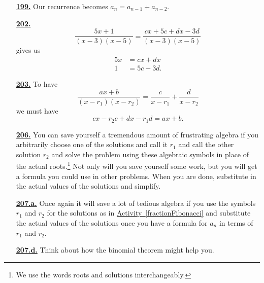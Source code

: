 \documentclass[10pt,]{book}
\theoremstyle{plain}
\theoremstyle{definition}
\theoremstyle{definition}
\theoremstyle{definition}
\numberwithin{equation}{chapter}
\newcommand{\amp}{&}
\begin{document}
\begin{itemize}[itemsep=1em]
\hypertarget{a-199}{}\item[\textbf{\hyperref[originalFibonacci]{199.}}]
\hypertarget{p-933}{}%
Our recurrence becomes \(a_n = a_{n-1} + a_{n-2}\).%

\hypertarget{a-202}{}\item[\textbf{\hyperref[partialfractionsintro]{202.}}]
\hypertarget{p-942}{}%
%
\begin{equation*}
\frac{5x+1}{(x-3)(x-5)} = \frac{cx+5c+dx-3d}{(x-3)(x-5)}
\end{equation*}
gives us%
\begin{align*}
5x \amp = cx+dx\\
1 \amp= 5c-3d\text{.}
\end{align*}
%

\hypertarget{a-203}{}\item[\textbf{\hyperref[partialfractions1]{203.}}]
\hypertarget{p-945}{}%
To have%
\begin{equation*}
\frac{ax+b}{(x-r_1)(x-r_2)} = \frac{c}{x-r_1} + \frac{d}{x-r_2}
\end{equation*}
we must have%
\begin{equation*}
cx-r_2c+dx-r_1d =ax+b\text{.}
\end{equation*}
%

\hypertarget{a-206}{}\item[\textbf{\hyperref[fractionFibonacci]{206.}}]
\hypertarget{p-953}{}%
You can save yourself a tremendous amount of frustrating algebra if you arbitrarily choose one of the solutions and call it \(r_1\) and call the other solution \(r_2\) and solve the problem using these algebraic symbols in place of the actual roots.\footnote{We use the words roots and solutions interchangeably.\label{fn-10}} Not only will you save yourself some work, but you will get a formula you could use in other problems. When you are done, substitute in the actual values of the solutions and simplify.%

\hypertarget{a-207.a}{}\item[\textbf{\hyperref[task-178]{207.a.}}]
\hypertarget{p-956}{}%
Once again it will save a lot of tedious algebra if you use the symbols \(r_1\) and \(r_2\) for the solutions as in \hyperref[fractionFibonacci]{Activity~\ref{fractionFibonacci}} and substitute the actual values of the solutions once you have a formula for \(a_n\) in terms of \(r_1\) and \(r_2\).%

\hypertarget{a-207.d}{}\item[\textbf{\hyperref[task-181]{207.d.}}]
\hypertarget{p-963}{}%
Think about how the binomial theorem might help you.%


\end{itemize}
\end{document}
